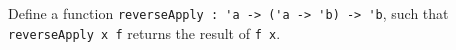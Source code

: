 \label{item:reverseApply} Define a function \lstinline{reverseApply : 'a -> ('a -> 'b) -> 'b}, such that \mbox{\lstinline{reverseApply x f}} returns the result of \lstinline{f x}.
